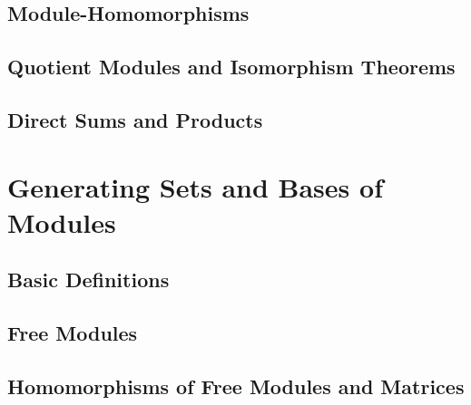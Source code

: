		

	\section{Module-Homomorphisms}
		
		

	\section{Quotient Modules and Isomorphism Theorems}

		
		
	\section{Direct Sums and Products}
	
		
		
\chapter{Generating Sets and Bases of Modules} \label{sec.GenSets}

	\section{Basic Definitions}

		

	\section{Free Modules}
	
		
		
	\section{Homomorphisms of Free Modules and Matrices}
	
		



\vspace{\fill}
\begingroup
\sloppy
\printbibliography[heading=subbibliography]
\endgroup
